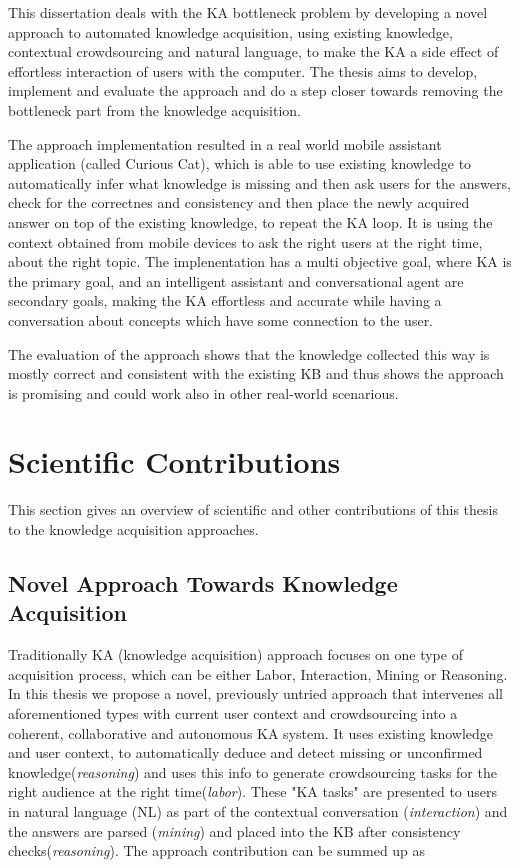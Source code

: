 This dissertation deals with the KA bottleneck problem by developing a novel
approach to automated knowledge acquisition, using existing knowledge,
contextual crowdsourcing and natural language, to make the KA a side effect of
effortless interaction of users with the computer. The thesis aims to develop,
implement and evaluate the approach and do a step closer towards removing the
bottleneck part from the knowledge acquisition.

The approach implementation resulted in a real world mobile assistant 
application (called Curious Cat), which is able to use existing knowledge to 
automatically infer 
what knowledge is missing and then ask users for the answers, check for
the correctnes and consistency and then place the newly acquired answer on
top of the existing knowledge, to repeat the KA loop. It is
using the context obtained from mobile devices to ask the right users at the 
right time, about the right topic. 
The implenentation has a multi objective goal, 
where KA is the primary goal, and an intelligent assistant and conversational 
agent are secondary goals, making the KA effortless and accurate while having a 
conversation about concepts which have some connection to the user.

The evaluation of the approach shows that the knowledge collected this way is
mostly correct and consistent with the existing KB and thus shows the approach
is promising and could work also in other real-world scenarious.

\section{Scientific Contributions}
This section gives an overview of scientific and other contributions of this 
thesis to the knowledge acquisition approaches.

\subsection{Novel Approach Towards Knowledge Acquisition}
Traditionally KA (knowledge acquisition) approach focuses on one type of 
acquisition process, which can be either Labor, Interaction, Mining or 
Reasoning\parencite{Zang2013}. In this thesis we propose a novel, previously 
untried approach that intervenes all aforementioned types with current user 
context and crowdsourcing into a coherent, collaborative and autonomous 
KA system. It uses existing knowledge and user context, to automatically 
deduce and detect missing or unconfirmed knowledge(\emph{reasoning}) and uses 
this info to generate crowdsourcing tasks for the right audience at the right 
time(\emph{labor}). These "KA tasks" are presented to users in natural language
(NL) as part of the contextual conversation (\emph{interaction}) and the 
answers are parsed (\emph{mining}) and placed into the KB after consistency 
checks(\emph{reasoning}). The approach contribution can be summed up as


